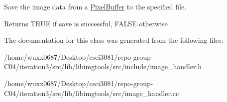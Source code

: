 Save the image data from a \hyperlink{classimage__tools_1_1PixelBuffer}{Pixel\+Buffer} to the specified file. 

\begin{DoxyReturn}{Returns}
T\+R\+UE if save is successful, F\+A\+L\+SE otherwise 
\end{DoxyReturn}


The documentation for this class was generated from the following files\+:\begin{DoxyCompactItemize}
\item 
/home/wuxx0687/\+Desktop/csci3081/repo-\/group-\/\+C04/iteration3/src/lib/libimgtools/src/include/image\+\_\+handler.\+h\item 
/home/wuxx0687/\+Desktop/csci3081/repo-\/group-\/\+C04/iteration3/src/lib/libimgtools/src/image\+\_\+handler.\+cc\end{DoxyCompactItemize}

